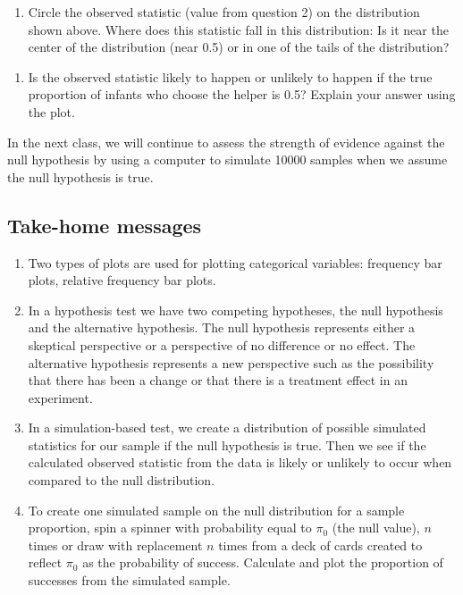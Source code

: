 \documentclass[
]{report}
\providecommand{\tightlist}{%
  \setlength{\itemsep}{0pt}\setlength{\parskip}{0pt}}
\begin{document}
\vspace{2in}

\begin{enumerate}
\def\labelenumi{\arabic{enumi}.}
\setcounter{enumi}{8}
\tightlist
\item
  Circle the observed statistic (value from question 2) on the distribution shown above. Where does this statistic fall in this distribution: Is it near the center of the distribution (near 0.5) or in one of the tails of the distribution?
\end{enumerate}

\vspace{0.2in}

\begin{enumerate}
\def\labelenumi{\arabic{enumi}.}
\setcounter{enumi}{9}
\tightlist
\item
  Is the observed statistic likely to happen or unlikely to happen if the true proportion of infants who choose the helper is 0.5? Explain your answer using the plot.
\end{enumerate}

\vspace{0.8in}

In the next class, we will continue to assess the strength of evidence against the null hypothesis by using a computer to simulate 10000 samples when we assume the null hypothesis is true.

\subsection{Take-home messages}\label{take-home-messages-3}

\begin{enumerate}
\def\labelenumi{\arabic{enumi}.}
\item
  Two types of plots are used for plotting categorical variables: frequency bar plots, relative frequency bar plots.
\item
  In a hypothesis test we have two competing hypotheses, the null hypothesis and the alternative hypothesis. The null hypothesis represents either a skeptical perspective or a perspective of no difference or no effect. The alternative hypothesis represents a new perspective such as the possibility that there has been a change or that there is a treatment effect in an experiment.
\item
  In a simulation-based test, we create a distribution of possible simulated statistics for our sample if the null hypothesis is true. Then we see if the calculated observed statistic from the data is likely or unlikely to occur when compared to the null distribution.
\item
  To create one simulated sample on the null distribution for a sample proportion, spin a spinner with probability equal to \(\pi_0\) (the null value), \(n\) times or draw with replacement \(n\) times from a deck of cards created to reflect \(\pi_0\) as the probability of success. Calculate and plot the proportion of successes from the simulated sample.
\end{enumerate}
\end{document}
